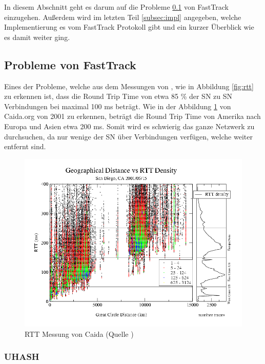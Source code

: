 In diesem Abschnitt geht es darum auf die Probleme \ref{subsec:probT} von FastTrack einzugehen.
Außerdem wird im letzten Teil \ref{subsec:impl} angegeben, welche Implementierung es vom FastTrack Protokoll gibt und ein kurzer Überblick wie es damit weiter ging.


\subsection{Probleme von FastTrack}
\label{subsec:probT}

Eines der Probleme, welche aus dem Messungen von \cite{liang2006fasttrack}, wie in Abbildung \ref{fig:rtt} zu erkennen ist, dass die Round Trip Time von etwa 85 \% der SN zu SN Verbindungen bei maximal 100 ms beträgt.
Wie in der Abbildung \ref{fig:rttcaida} von Caida.org von 2001 \cite{caida} zu erkennen, beträgt die Round Trip Time von Amerika nach Europa und Asien etwa 200 ms.
Somit wird es schwierig das ganze Netzwerk zu durchsuchen, da nur wenige der SN über Verbindungen verfügen, welche weiter entfernt sind.

\begin{figure}
\includegraphics[scale=0.3]{gfx/dist_density_rie_20010513}
\caption{RTT Messung von Caida (Quelle \cite{caida})}
\label{fig:rttcaida}
\end{figure}


\subsubsection{UHASH}
\label{subsubsec:uhash}

